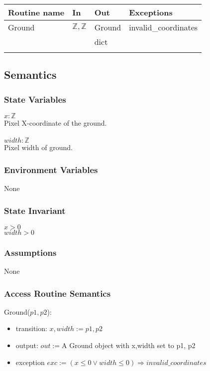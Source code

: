 \documentclass[12pt]{article}
\begin{document}
\begin{tabular}{| l | l | l | l |}
\hline
\textbf{Routine name} & \textbf{In} & \textbf{Out} & \textbf{Exceptions}\\
\hline
Ground &$\mathbb{Z}, \mathbb{Z}$ & Ground & invalid\_coordinates\\
\hline
\textcolor{red}{serialize & & dict & \\}
\hline

\end{tabular}

\subsection* {Semantics}

\subsubsection* {State Variables}

$x: \mathbb{Z}$\\
Pixel X-coordinate of the ground.\\\\
$width: \mathbb{Z}$\\
Pixel width of ground.
\subsubsection* {Environment Variables}

None

\subsubsection* {State Invariant}
$x > 0$\\
$width > 0$\\ 
\subsubsection* {Assumptions}
None
\subsubsection* {Access Routine Semantics}

\noindent Ground($p1, p2$):
\begin{itemize}
\item transition: $x,width := p1, p2$
\item output: $out := $A Ground object with x,width set to p1, p2
\item exception $ exc := (x \leq 0 \lor width \leq 0 ) \Rightarrow invalid\_coordinates $
\end{itemize}
\end{document}
